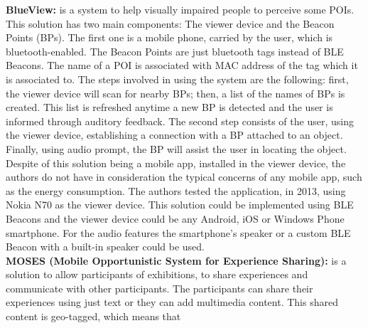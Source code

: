 \textbf{BlueView\cite{Chen2013}:} is a system to help
visually impaired people to perceive some POIs.
This solution has two main components: The viewer device
and the Beacon Points (BPs). The first one is a mobile phone,
carried by the user, which is bluetooth-enabled.
The Beacon Points are just bluetooth tags instead of
BLE Beacons. The name of a POI is associated with
MAC address of the tag which it is associated to.
The steps involved in using the system are the
following: first, the viewer device will scan
for nearby BPs; then, a list of the names of
BPs is created. This list is refreshed anytime a new
BP is detected and the user is informed through auditory
feedback. The second step consists of the user, using
the viewer device, establishing a connection with a BP
attached to an object. Finally, using audio prompt, the BP
will assist the user in locating the object.
Despite of this solution being a mobile app, installed
in the viewer device, the authors do not have in
consideration the typical concerns of any mobile app,
such as the energy consumption.
The authors tested the application, in 2013,
using Nokia N70 as the viewer device.
This solution could be implemented using BLE Beacons
and the viewer device could be any Android, iOS or
Windows Phone smartphone.
For the audio features the smartphone's speaker or
a custom BLE Beacon with a built-in speaker could be
used.
\\
\textbf{MOSES
(Mobile Opportunistic System for Experience Sharing)\cite{BenAbdesslem2014}:}
is a solution to allow
participants of exhibitions, to share experiences and
communicate with other participants.
The participants can share their experiences using
just text or they can add multimedia content.
This shared content is geo-tagged, which means that
